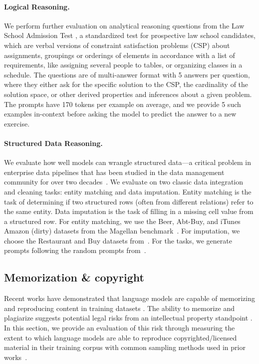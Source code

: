 \paragraph{Logical Reasoning.}
We perform further evaluation on analytical reasoning questions from the Law School Admission Test \citep[\lsat;][]{zhong2021arlsat}, a standardized test for prospective law school candidates, which are verbal versions of constraint satisfaction problems (CSP) about assignments, groupings or orderings of elements in accordance with a list of requirements, like assigning several people to tables, or organizing classes in a schedule. The questions are of multi-answer format with 5 answers per question, where they either ask for the specific solution to the CSP, the cardinality of the solution space, or other derived properties and inferences about a given problem. The prompts have 170 tokens per example on average, and we provide 5 such examples in-context before asking the model to predict the answer to a new exercise.

\paragraph{Structured Data Reasoning.} 
We evaluate how well models can wrangle structured data---a critical problem in enterprise data pipelines that has been studied in the data management community for over two decades~\citep{golshan2017data}. We evaluate on two classic data integration and cleaning tasks: entity matching and data imputation. Entity matching is the task of determining if two structured rows (often from different relations) refer to the same entity. Data imputation is the task of filling in a missing cell value from a structured row. For entity matching, we use the Beer, Abt-Buy, and iTunes Amazon (dirty) datasets from the Magellan benchmark~\citep{konda2016magellan}. For imputation, we choose the Restaurant and Buy datasets from~\citet{mei2021capturing}. For the tasks, we generate prompts following the random prompts from~\citet{narayan2022can}.


\hypertarget{memorization}{\subsection{Memorization \& copyright}}
\label{sec:copyright}
Recent works have demonstrated that language models are capable of memorizing and reproducing content in training datasets \citep{carlini2019secret,lee2022language,carlini2022quantifying,kandpal2022deduplicating,carlini2021extracting}. 
The ability to memorize and plagiarize suggests potential legal risks from an intellectual property standpoint \cite[][\S5.4]{bommasani2021opportunities}.
In this section, we provide an evaluation of this risk through measuring the extent to which language models are able to reproduce copyrighted/licensed material in their training corpus with common sampling methods used in prior works~\citep{carlini2021extracting}.

